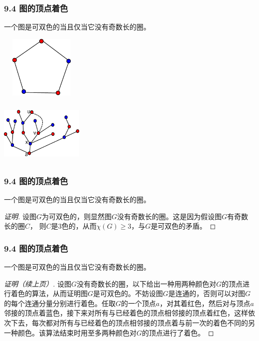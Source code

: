 \documentclass{beamer}
\begin{document}
\begin{CJK}{UTF8}{gbsn}
\begin{frame}
  \frametitle{9.4 图的顶点着色}
  \begin{theorem9.4.1}
    一个图是可双色的当且仅当它没有奇数长的圈。
  \end{theorem9.4.1}
\vspace{1cm}
  \begin{minipage}{0.45\linewidth}
\includegraphics[width=4cm,height=3cm]{pentagon5}    
  \end{minipage}
  \begin{minipage}{0.45\linewidth}
    \includegraphics[width=4cm,height=3cm]{color26}
  \end{minipage}
\end{frame}

\begin{frame}
  \frametitle{9.4 图的顶点着色}
  \begin{theorem9.4.1}
    一个图是可双色的当且仅当它没有奇数长的圈。
  \end{theorem9.4.1}
  \begin{proof}[证明]
    设图$G$为可双色的，则显然图$G$没有奇数长的圈。这是因为假设图$G$有奇数长的圈$C$，
  则$C$是3色的，从而$\chi(G) \geq 3$，与$G$是可双色的矛盾。  
  \end{proof}
\end{frame}

\begin{frame}
  \frametitle{9.4 图的顶点着色}
  \begin{theorem9.4.1}
    一个图是可双色的当且仅当它没有奇数长的圈。
  \end{theorem9.4.1}
  \begin{proof}[证明（续上页）]
   

  设图$G$没有奇数长的圈，以下给出一种用两种颜色对$G$的顶点进行着色的算法，从而证明图$G$是可双色的。不妨设图$G$是连通的，否则可以对图$G$的每个连通分量分别进行着色。任取$G$的一个顶点$a$，对其着红色，然后对与顶点$a$邻接的顶点着蓝色，接下来对所有与已经着色的顶点相邻接的顶点着红色，这样依次下去，每次都对所有与已经着色的顶点相邻接的顶点着与前一次的着色不同的另一种颜色。该算法结束时用至多两种颜色对$G$的顶点进行了着色。
  

\end{proof}
\end{frame}
\end{CJK}
\end{document}
